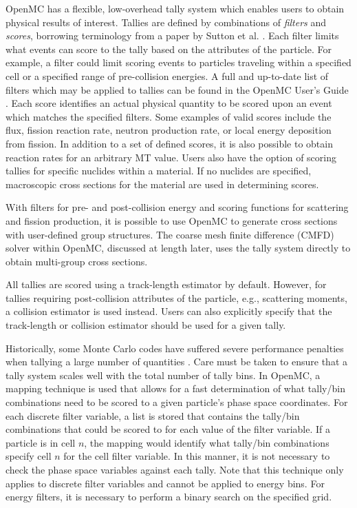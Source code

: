 \documentclass{snamc2013}
\begin{document}
OpenMC has a flexible, low-overhead tally system which enables users to obtain
physical results of interest. Tallies are defined by combinations of
\textit{filters} and \textit{scores}, borrowing terminology from a paper by
Sutton et al. \cite{mc-sutton-2007}. Each filter limits what events can score to
the tally based on the attributes of the particle. For example, a filter could
limit scoring events to particles traveling within a specified cell or a
specified range of pre-collision energies. A full and up-to-date list of filters
which may be applied to tallies can be found in the OpenMC User's Guide
\cite{romano-2013-doc}. Each score identifies an actual physical quantity to be
scored upon an event which matches the specified filters. Some examples of valid
scores include the flux, fission reaction rate, neutron production rate, or
local energy deposition from fission. In addition to a set of defined scores, it
is also possible to obtain reaction rates for an arbitrary MT value. Users also
have the option of scoring tallies for specific nuclides within a material. If
no nuclides are specified, macroscopic cross sections for the material are used
in determining scores.

With filters for pre- and post-collision energy and scoring functions for
scattering and fission production, it is possible to use OpenMC to generate
cross sections with user-defined group structures. The coarse mesh finite
difference (CMFD) solver within OpenMC, discussed at length later, uses the
tally system directly to obtain multi-group cross sections.

All tallies are scored using a track-length estimator by default. However, for
tallies requiring post-collision attributes of the particle, e.g., scattering
moments, a collision estimator is used instead. Users can also explicitly
specify that the track-length or collision estimator should be used for a given
tally.

Historically, some Monte Carlo codes have suffered severe performance penalties
when tallying a large number of quantities \cite{pnst-vanveen-2011}. Care must
be taken to ensure that a tally system scales well with the total number of
tally bins. In OpenMC, a mapping technique is used that allows for a fast
determination of what tally/bin combinations need to be scored to a given
particle's phase space coordinates. For each discrete filter variable, a list is
stored that contains the tally/bin combinations that could be scored to for each
value of the filter variable. If a particle is in cell $n$, the mapping would
identify what tally/bin combinations specify cell $n$ for the cell filter
variable. In this manner, it is not necessary to check the phase space variables
against each tally. Note that this technique only applies to discrete filter
variables and cannot be applied to energy bins. For energy filters, it is
necessary to perform a binary search on the specified grid.
\end{document}
